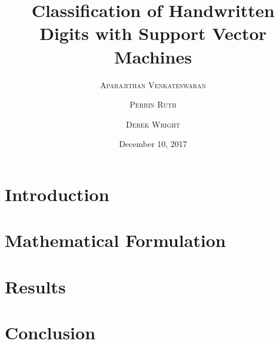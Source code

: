 \documentclass[twoside,twocolumn]{article}
\title{Classification of Handwritten Digits with Support Vector Machines} %
\author{%
\textsc{Aparajithan Venkateswaran} \\[1ex] %
\and %
\textsc{Perrin Ruth} \\[1ex] %
\and %
\textsc{Derek Wright} \\[1ex] %
}
\date{December 10, 2017} %
\begin{document}
\maketitle


\section{Introduction}




\section{Mathematical Formulation}








\section{Results}




\section{Conclusion}



%
%

\nocite{*}



\end{document}
